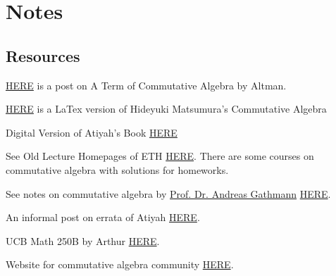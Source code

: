 \section{Notes}

\subsection{Resources}


\href{https://mathoverflow.net/questions/385312/latest-a-term-of-commutative-algebra-by-altman-and-kleiman}{HERE} is a post on A Term of Commutative Algebra by Altman.

\href{https://aareyanmanzoor.github.io/assets/matsumura-CA.pdf}{HERE} is a LaTex version of Hideyuki Matsumura's Commutative Algebra

Digital Version of Atiyah's Book \href{https://digitalcommons.unl.edu/cgi/viewcontent.cgi?article=1004&context=mathclass}{HERE}

See Old Lecture Homepages of ETH \href{https://www2.math.ethz.ch/education/bachelor/lectures.html}{HERE}. There are some courses on commutative algebra with solutions for homeworks.

See notes on commutative algebra by \href{https://math.rptu.de/en/wgs/agag/people/head/gathmann/}{Prof. Dr. Andreas Gathmann} \href{https://agag-gathmann.math.rptu.de/en/commalg.php}{HERE}.

An informal post on errata of Atiyah \href{https://mathoverflow.net/questions/42241/errata-for-atiyah-macdonald}{HERE}.

UCB Math 250B by Arthur \href{https://math.berkeley.edu/~ogus/Math_250B-2016/index.html}{HERE}.

Website for commutative algebra community \href{https://commalg.org}{HERE}.